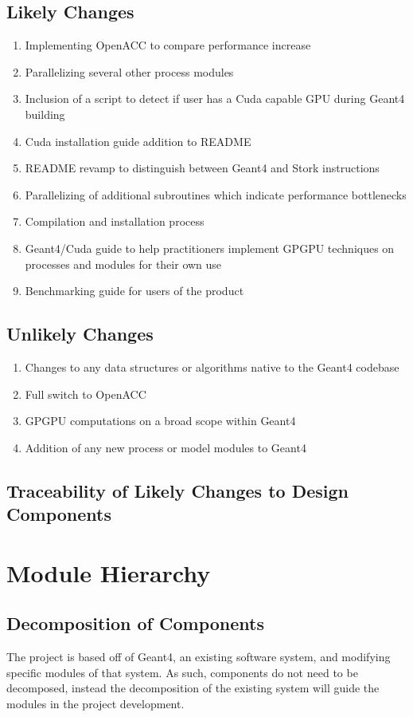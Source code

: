 \documentclass[12pt]{article}
\begin{document}
\subsection{Likely Changes} %
\begin{enumerate}
\item Implementing OpenACC to compare performance increase
\item Parallelizing several other process modules
\item Inclusion of a script to detect if user has a Cuda capable GPU during Geant4 building
\item Cuda installation guide addition to README
\item README revamp to distinguish between Geant4 and Stork instructions
\item Parallelizing of additional subroutines which indicate performance bottlenecks
\item Compilation and installation process
\item Geant4/Cuda guide to help practitioners implement GPGPU techniques on processes and modules for their own use
\item Benchmarking guide for users of the product
\end{enumerate}

\subsection{Unlikely Changes} %
\begin{enumerate}
\item Changes to any data structures or algorithms native to the Geant4 codebase
\item Full switch to OpenACC
\item GPGPU computations on a broad scope within Geant4
\item Addition of any new process or model modules to Geant4
\end{enumerate}

\subsection{Traceability of Likely Changes to Design Components}

\section{Module Hierarchy}%
\subsection{Decomposition of Components}
The project is based off of Geant4, an existing software system, and modifying specific modules of that system. As such, components do not need to be decomposed, instead the decomposition of the existing system will guide the modules in the project development.\\
\end{document}
